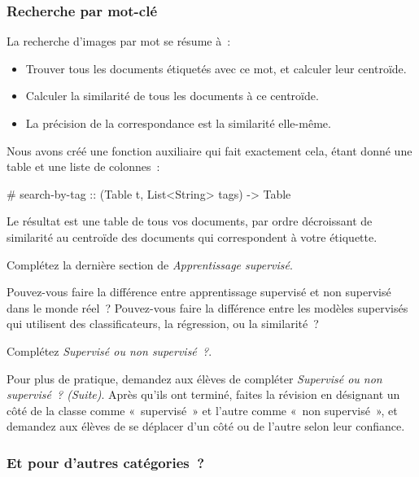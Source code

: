 \documentclass[12pt,a4paper]{article}
\newcommand{\contrat}[1]{%
  \begin{contractbox}
    \ttfamily #1
  \end{contractbox}
}
\begin{document}
\subsubsection{Recherche par mot-clé}

\begin{keypointbox}
  La recherche d'images par mot se résume à~:
  \begin{itemize}
    \item Trouver tous les documents étiquetés avec ce mot, et calculer leur centroïde.
    \item Calculer la similarité de tous les documents à ce centroïde.
    \item La précision de la correspondance est la similarité elle-même.
  \end{itemize}

  Nous avons créé une fonction auxiliaire qui fait exactement cela, étant donné une table et une liste de colonnes~:

  \contrat{\# search-by-tag :: (Table t, List<String> tags) -> Table}

  Le résultat est une table de tous vos documents, par ordre décroissant de similarité au centroïde des documents qui correspondent à votre étiquette.
\end{keypointbox}

\begin{activitybox}
  Complétez la dernière section de \emph{Apprentissage supervisé}.

  Pouvez-vous faire la différence entre apprentissage supervisé et non supervisé dans le monde réel~? Pouvez-vous faire la différence entre les modèles supervisés qui utilisent des classificateurs, la régression, ou la similarité~?

  Complétez \emph{Supervisé ou non supervisé~?}.
\end{activitybox}

\begin{instructornotes}
  Pour plus de pratique, demandez aux élèves de compléter \emph{Supervisé ou non supervisé~? (Suite)}. Après qu'ils ont terminé, faites la révision en désignant un côté de la classe comme «~supervisé~» et l'autre comme «~non supervisé~», et demandez aux élèves de se déplacer d'un côté ou de l'autre selon leur confiance.
\end{instructornotes}

\subsubsection{Et pour d'autres catégories~?}
\end{document}
